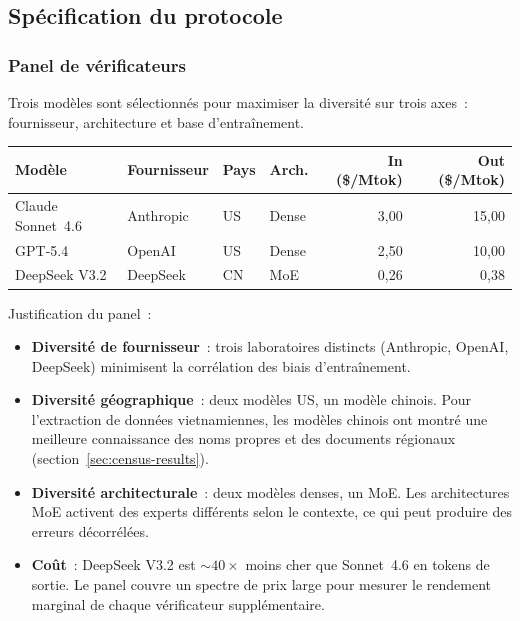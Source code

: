 \subsection{Sp\'ecification du protocole}\label{sec:multi-verif-spec}

\subsubsection{Panel de v\'erificateurs}\label{sec:verifier-panel}

Trois mod\`eles sont s\'electionn\'es pour maximiser la diversit\'e sur trois
axes~: fournisseur, architecture et base d'entra\^inement.

\begin{center}
\small
\begin{tabular}{llllrr}
\toprule
\textbf{Mod\`ele} & \textbf{Fournisseur} & \textbf{Pays} & \textbf{Arch.}
  & \textbf{In (\$/Mtok)} & \textbf{Out (\$/Mtok)} \\
\midrule
Claude Sonnet~4.6  & Anthropic & US & Dense   & 3,00 & 15,00 \\
GPT-5.4            & OpenAI    & US & Dense   & 2,50 & 10,00 \\
DeepSeek V3.2      & DeepSeek  & CN & MoE     & 0,26 &  0,38 \\
\bottomrule
\end{tabular}
\end{center}

\noindent Justification du panel~:
\begin{itemize}
\item \textbf{Diversit\'e de fournisseur}~: trois laboratoires distincts
  (Anthropic, OpenAI, DeepSeek) minimisent la corr\'elation des biais
  d'entra\^inement.
\item \textbf{Diversit\'e g\'eographique}~: deux mod\`eles US, un mod\`ele chinois.
  Pour l'extraction de donn\'ees vietnamiennes, les mod\`eles chinois ont
  montr\'e une meilleure connaissance des noms propres et des documents
  r\'egionaux (section~\ref{sec:census-results}).
\item \textbf{Diversit\'e architecturale}~: deux mod\`eles denses, un MoE.
  Les architectures MoE activent des experts diff\'erents selon le contexte,
  ce qui peut produire des erreurs d\'ecorr\'el\'ees.
\item \textbf{Co\^ut}~: DeepSeek V3.2 est ${\sim}40\times$ moins cher que
  Sonnet~4.6 en tokens de sortie. Le panel couvre un spectre de prix large
  pour mesurer le rendement marginal de chaque v\'erificateur suppl\'ementaire.
\end{itemize}

